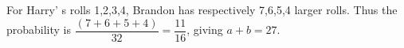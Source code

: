 For Harry' s rolls 1,2,3,4, Brandon has respectively 7,6,5,4 larger rolls. Thus the probability is $\dfrac{(7+6+5+4)}{32}=\dfrac{11}{16}$, giving $\boxed{a+b=27}$.
